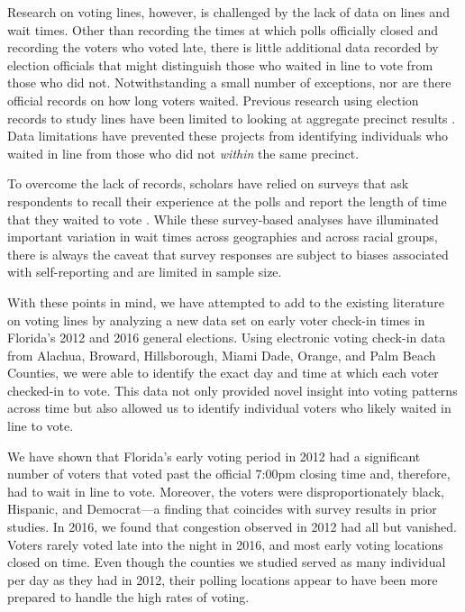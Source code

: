 \documentclass[12pt,titlepage]{article}
\begin{document}
Research on voting lines, however, is challenged by the lack of data
on lines and wait times.  Other than recording the times at which
polls officially closed and recording the voters who voted late, there
is little additional data recorded by election officials that might
distinguish those who waited in line to vote from those who did not.
Notwithstanding a small number of exceptions, nor are there official
records on how long voters waited.  Previous research using election
records to study lines have been limited to looking at aggregate
precinct results \citep{herronsmith:closingtimes,
  pettigrew:longlinesminorityprecincts}.  Data limitations have
prevented these projects from identifying individuals who waited in
line from those who did not \emph{within} the same precinct.

To overcome the lack of records, scholars have relied on surveys that
ask respondents to recall their experience at the polls and report the
length of time that they waited to vote
\citep{stewart:waitingtovote2012, pettigrew:racegapwaittimes}.  While
these survey-based analyses have illuminated important variation in
wait times across geographies and across racial groups, there is
always the caveat that survey responses are subject to biases
associated with self-reporting and are limited in sample size.

With these points in mind, we have attempted to add to the existing
literature on voting lines by analyzing a new data set on early voter
check-in times in Florida's 2012 and 2016 general elections. Using
electronic voting check-in data from Alachua, Broward, Hillsborough,
Miami Dade, Orange, and Palm Beach Counties, we were able to identify
the exact day and time at which each voter checked-in to vote.  This
data not only provided novel insight into voting patterns across time
but also allowed us to identify individual voters who likely waited in
line to vote.

We have shown that Florida's early voting period in 2012 had a
significant number of voters that voted past the official 7:00pm
closing time and, therefore, had to wait in line to vote.  Moreover,
the voters were disproportionately black, Hispanic, and Democrat---a
finding that coincides with survey results in prior studies.  In 2016,
we found that congestion observed in 2012 had all but vanished.
Voters rarely voted late into the night in 2016, and most early voting
locations closed on time.  Even though the counties we studied served
as many individual per day as they had in 2012, their polling
locations appear to have been more prepared to handle the high rates
of voting.
  
\end{document}
